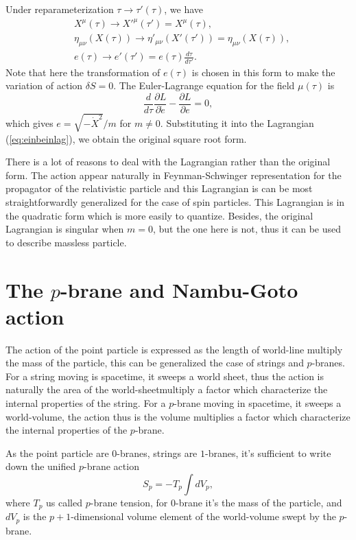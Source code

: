 \documentclass[graybox,envcountchap,sectrefs]{svmono}
\begin{document}
Under reparameterization $\tau\to \tau'(\tau)$, we have
\begin{align}
&X^{\mu}(\tau)\to X'^{\mu}(\tau')=X^{\mu}(\tau),\\
&\eta_{\mu\nu}(X(\tau))\to \eta'_{\mu\nu}(X'(\tau'))=\eta_{\mu\nu}(X(\tau)),\\
&e(\tau)\to e'(\tau')=e(\tau)\frac{d\tau}{d\tau'}.
\end{align}
Note that here the transformation of $e(\tau)$ is chosen in this form to make the variation of action $\delta S=0$.
The Euler-Lagrange equation for the field $\mu(\tau)$ is
\begin{equation}
\frac{d}{d\tau}\frac{\partial L}{\partial \dot{e}}-\frac{\partial L}{\partial e}=0,
\end{equation}
 which gives $e=\sqrt{-\dot{X}^2}/m$ for $m\neq 0$. Substituting it into the Lagrangian (\ref{eq:einbeinlag}), we obtain the original square root form.
 
There is a lot of reasons to deal with the Lagrangian rather than the original form. The action appear naturally in Feynman-Schwinger representation for the propagator of the relativistic particle and this Lagrangian is can be most straightforwardly generalized for the case of spin particles. This Lagrangian is in the quadratic form which is more easily to quantize. Besides, the original Lagrangian is singular when $m=0$, but the one here is not, thus it can be used to describe massless particle.

\section{The $p$-brane and Nambu-Goto  action}
The action of the point particle is expressed as the length of world-line multiply the mass of the particle, this can be generalized the case of strings and $p$-branes. For a string moving is spacetime, it sweeps a world sheet, thus the action is naturally the area of the world-sheetmultiply a factor which characterize the internal properties of the string. For a $p$-brane moving in spacetime, it sweeps a world-volume, the action thus is the volume multiplies a factor which characterize the internal properties of the $p$-brane. 

As the point particle are $0$-branes, strings are $1$-branes, it's sufficient to write down the unified $p$-brane action
\begin{equation}
S_p=-T_p\int dV_p,
\end{equation}
where $T_p$ us called $p$-brane tension, for $0$-brane it's the mass of the particle, and $dV_p$ is the $p+1$-dimensional volume element of the world-volume swept by the $p$-brane.  
\end{document}
